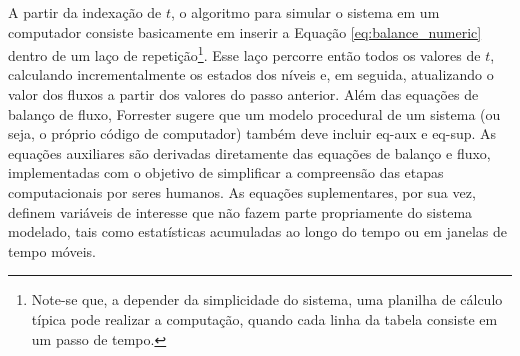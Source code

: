\documentclass[./main.tex]{subfiles}
\begin{document}
A partir da indexação de $t$, o algoritmo para simular o sistema em um computador consiste basicamente em inserir a Equação \eqref{eq:balance_numeric} dentro de um laço de repetição\footnote{Note-se que, a depender da simplicidade do sistema, uma planilha de cálculo típica pode realizar a computação, quando cada linha da tabela consiste em um passo de tempo.}. Esse laço percorre então todos os valores de $t$, calculando incrementalmente os estados dos níveis e, em seguida, atualizando o valor dos fluxos a partir dos valores do passo anterior. Além das equações de balanço de fluxo, Forrester sugere que um modelo procedural de um sistema (ou seja, o próprio código de computador) também deve incluir \gls{eq-aux} e \gls{eq-sup}. As equações auxiliares são derivadas diretamente das equações de balanço e fluxo, implementadas com o objetivo de simplificar a compreensão das etapas computacionais por seres humanos. As equações suplementares, por sua vez, definem variáveis de interesse que não fazem parte propriamente do sistema modelado, tais como estatísticas acumuladas ao longo do tempo ou em janelas de tempo móveis.
\end{document}
